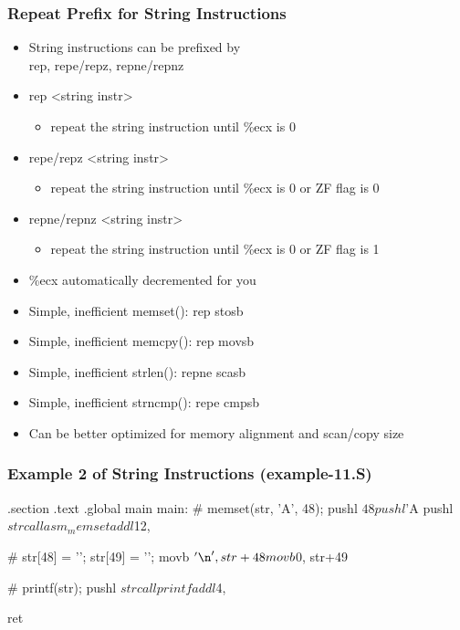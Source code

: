 \documentclass[11pt,xcolor=dvipsnames]{beamer}
\newcommand{\vs}{\vspace{0.5em}}
\newcommand{\mvs}{\vspace{-0.95em}}
\begin{document}
\begin{frame}[fragile,t]
\frametitle{Repeat Prefix for String Instructions}
\begin{itemize}
  \item String instructions can be prefixed by \\ {\ttfamily rep, repe/repz, repne/repnz}
  \item {\ttfamily rep <string instr>}
  \begin{itemize}
    \item repeat the string instruction until {\ttfamily \%ecx} is 0
  \end{itemize}
  \item {\ttfamily repe/repz <string instr>}
  \begin{itemize}
    \item repeat the string instruction until {\ttfamily \%ecx} is 0 or ZF flag is 0
  \end{itemize}
  \item {\ttfamily repne/repnz <string instr>}
  \begin{itemize}
    \item repeat the string instruction until {\ttfamily \%ecx} is 0 or ZF flag is 1
  \end{itemize}
  \item {\ttfamily \%ecx} automatically decremented for you
  \vs
  \pause
  \item Simple, inefficient {\ttfamily memset()}: {\ttfamily rep stosb}
  \item Simple, inefficient {\ttfamily memcpy()}: {\ttfamily rep movsb}
  \item Simple, inefficient {\ttfamily strlen()}: {\ttfamily repne scasb}
  \item Simple, inefficient {\ttfamily strncmp()}: {\ttfamily repe cmpsb}
  \item Can be better optimized for memory alignment and scan/copy size
\end{itemize}
\end{frame}

\begin{frame}[fragile,t]
\mvs
\frametitle{Example 2 of String Instructions (example-11.S)}
\begin{gascode}
.section .text
.global main
main:
  # memset(str, 'A', 48);
  pushl $48
  pushl $'A
  pushl $str
  call asm_memset
  addl $12, %

  # str[48] = '\n'; str[49] = '\0';
  movb $'\n', str+48
  movb $0, str+49

  # printf(str);
  pushl $str
  call printf
  addl $4, %

  ret
\end{gascode}
\end{frame}
\end{document}
